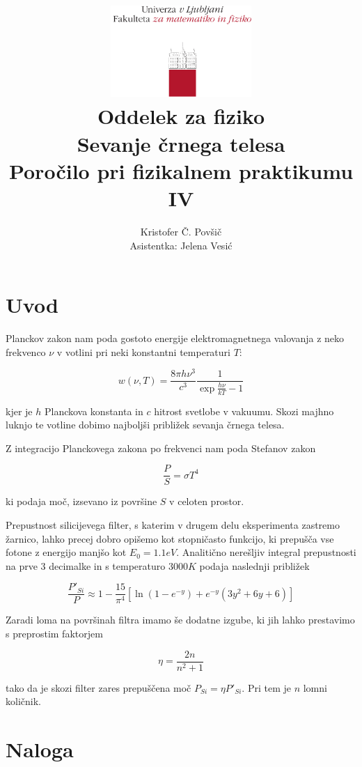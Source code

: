\documentclass[12pt]{report}
\title{
  \includegraphics[width=0.4\textwidth]{fmf_logo}\\
  {\small Oddelek za fiziko} \\
  {Sevanje črnega telesa}\\
  {\small Poročilo pri fizikalnem praktikumu IV}\\

}
\date{}
\author{ Kristofer Č. Povšič \\[5 cm]
 \small  Asistentka: Jelena Vesić\\
}
\begin{document}
\setcounter{page}{2}

\maketitle

\chapter*{Uvod}

Planckov zakon nam poda gostoto energije elektromagnetnega valovanja z neko frekvenco $\nu$ v votlini pri neki konstantni temperaturi $T$: 

\begin{equation}
  w( \nu, T) = \frac{8 \pi h \nu^3}{c^3} \frac{1}{\exp{\frac{h \nu}{kT}} - 1}
\end{equation}

kjer je $h$ Planckova konstanta in $c$ hitrost svetlobe v vakuumu. Skozi majhno luknjo te votline dobimo najboljši približek sevanja črnega telesa.

Z integracijo Planckovega zakona po frekvenci nam poda Stefanov zakon 

\begin{equation}
  \frac{P}{S} = \sigma T^4
\end{equation}

ki podaja moč, izsevano iz površine $S$ v celoten prostor. 

Prepustnost silicijevega filter, s katerim v drugem delu eksperimenta zastremo žarnico, lahko precej dobro opišemo kot stopničasto funkcijo, ki prepušča vse fotone z energijo manjšo kot $E_0 = 1.1 \si{eV}$. Analitično nerešljiv integral prepustnosti na prve 3 decimalke in s temperaturo $3000 \si{K}$ podaja naslednji približek 

\begin{equation}
  \frac{P'_{Si}}{P} \approx 1 - \frac{15}{\pi^4} \left[\ln(1 - e^{-y}) + e^{-y}(3y^2 + 6y +6)\right]
\end{equation}

Zaradi loma na površinah filtra imamo še dodatne izgube, ki jih lahko prestavimo s preprostim faktorjem 

\begin{equation}
  \eta = \frac{2n}{n^2 + 1}
\end{equation}

tako da je skozi filter zares prepuščena moč $P_{Si} = \eta P'_{Si}$. Pri tem je $n$ lomni količnik. 


\chapter*{Naloga}
\end{document}
